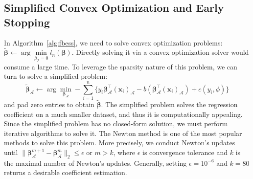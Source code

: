 \subsection{Simplified Convex Optimization and Early Stopping}\label{sec:approximiated-newton-update}

In Algorithm~\ref{alg:fbess}, we need to solve convex optimization problems:
$\tilde{\boldsymbol \beta} \leftarrow \arg\min\limits_{\beta_{\mathcal{I}} = 0} l_n(\boldsymbol\beta ).$
Directly solving it via a convex optimization solver would consume a large time.
To leverage the sparsity nature of this problem, we can turn to solve a simplified problem:
$$\tilde{\boldsymbol \beta}_{\mathcal{A}} \leftarrow \arg\min\limits_{\boldsymbol{\beta}_{\mathcal{A}}}- \sum_{i=1}^n\{y_i \boldsymbol{\beta}_{\mathcal{A}}^\top (\boldsymbol{x}_i)_{\mathcal{A}} - b(\boldsymbol{\beta}_{\mathcal{A}}^\top (\boldsymbol{x}_i)_{\mathcal{A}}) + c(y_i,\phi)\} $$
and pad zero entries to obtain $\tilde{\boldsymbol \beta}$.
The simplified problem solves the regression coefficient on a much smaller dataset, and thus it is computationally appealing.
Since the simplified problem has no closed-form solution, we must perform iterative algorithms to solve it.
The Newton method is one of the most popular methods to solve this problem.
More precisely, we conduct Newton's updates
until $\| {\boldsymbol \beta}_{\mathcal{A}}^{m+1} - {\boldsymbol \beta}_{\mathcal{A}}^{m}\|_2 \leq \epsilon$ or $m > k$,
where $\epsilon$ is convergence tolerance and $k$ is the maximal number of Newton's updates.
Generally, setting $\epsilon = 10^{-6}$ and $k = 80$ returns a desirable coefficient estimation.
